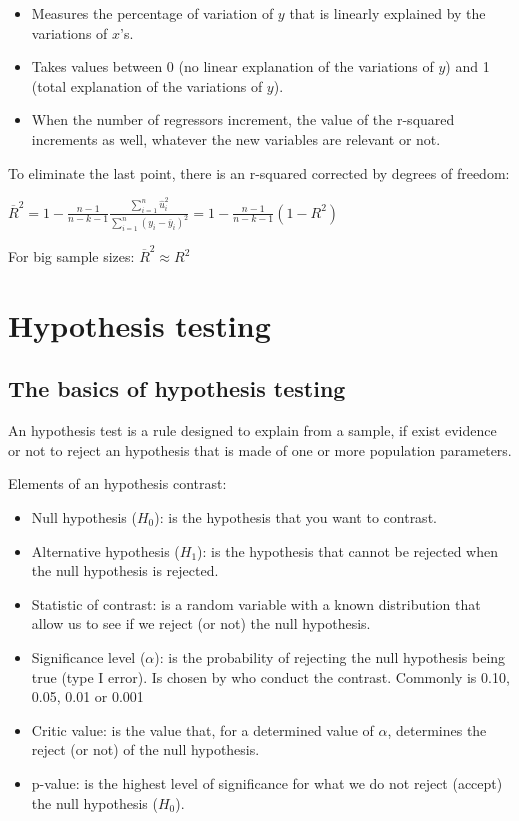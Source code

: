 \documentclass[10pt, a4paper, landscape]{extarticle}
\begin{document}
\begin{multicols}{3}
\begin{itemize}[leftmargin=*]
\item Measures the percentage of variation of $y$ that is linearly explained by the variations of $x$'s.
\item Takes values between 0 (no linear explanation of the variations of $y$) and 1 (total explanation of the variations of $y$).
\item When the number of regressors increment, the value of the r-squared increments as well, whatever the new variables are relevant or not.
\end{itemize}

To eliminate the last point, there is an r-squared corrected by degrees of freedom:

$\overline{R}^2 = 1 - \frac{n-1}{n-k-1} \frac{\sum_{i=1}^n \hat{u}_i^2}{\sum_{i=1}^n (y_i - \overline{y}_i)^2} = 1 - \frac{n-1}{n-k-1} (1-R^2)$

For big sample sizes: $\overline{R}^2 \approx R^2$

\section*{Hypothesis testing}
\subsection*{The basics of hypothesis testing}

An hypothesis test is a rule designed to explain from a sample, if exist evidence or not to reject an hypothesis that is made of one or more population parameters.

Elements of an hypothesis contrast:

\begin{itemize}[leftmargin=*]
\item Null hypothesis ($H_0$): is the hypothesis that you want to contrast.
\item Alternative hypothesis ($H_1$): is the hypothesis that cannot be rejected when the null hypothesis is rejected.
\item Statistic of contrast: is a random variable with a known distribution that allow us to see if we reject (or not) the null hypothesis.
\item Significance level ($\alpha$): is the probability of rejecting the null hypothesis being true (type I error). Is chosen by who conduct the contrast. Commonly is 0.10, 0.05, 0.01 or 0.001
\item Critic value: is the value that, for a determined value of $\alpha$, determines the reject (or not) of the null hypothesis.
\item p-value: is the highest level of significance for what we do not reject (accept) the null hypothesis ($H_0$).
\end{itemize}


\end{multicols}
\end{document}
